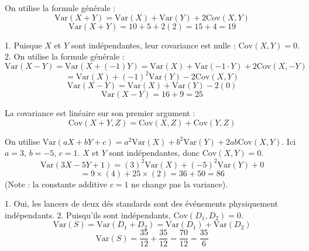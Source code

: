 
\begin{correctionbox}
On utilise la formule générale :
$$ \text{Var}(X+Y) = \text{Var}(X) + \text{Var}(Y) + 2\text{Cov}(X,Y) $$
$$ \text{Var}(X+Y) = 10 + 5 + 2(2) = 15 + 4 = 19 $$
\end{correctionbox}

\begin{correctionbox}
1.  Puisque $X$ et $Y$ sont indépendantes, leur covariance est nulle : $\text{Cov}(X,Y) = 0$.
2.  On utilise la formule générale :
    $$ \text{Var}(X-Y) = \text{Var}(X + (-1)Y) = \text{Var}(X) + \text{Var}(-1 \cdot Y) + 2\text{Cov}(X, -Y) $$
    $$ = \text{Var}(X) + (-1)^2 \text{Var}(Y) - 2\text{Cov}(X, Y) $$
    $$ \text{Var}(X-Y) = \text{Var}(X) + \text{Var}(Y) - 2(0) $$
    $$ \text{Var}(X-Y) = 16 + 9 = 25 $$
\end{correctionbox}

\begin{correctionbox}
La covariance est linéaire sur son premier argument :
$$ \text{Cov}(X+Y, Z) = \text{Cov}(X, Z) + \text{Cov}(Y, Z) $$
\end{correctionbox}

\begin{correctionbox}
On utilise $\text{Var}(aX + bY + c) = a^2 \text{Var}(X) + b^2 \text{Var}(Y) + 2ab\text{Cov}(X,Y)$.
Ici $a=3$, $b=-5$, $c=1$. $X$ et $Y$ sont indépendantes, donc $\text{Cov}(X,Y)=0$.
$$ \text{Var}(3X - 5Y + 1) = (3)^2 \text{Var}(X) + (-5)^2 \text{Var}(Y) + 0 $$
$$ = 9 \times (4) + 25 \times (2) = 36 + 50 = 86 $$
(Note : la constante additive $c=1$ ne change pas la variance).
\end{correctionbox}

\begin{correctionbox}
1.  Oui, les lancers de deux dés standards sont des événements physiquement indépendants.
2.  Puisqu'ils sont indépendants, $\text{Cov}(D_1, D_2) = 0$.
    $$ \text{Var}(S) = \text{Var}(D_1 + D_2) = \text{Var}(D_1) + \text{Var}(D_2) $$
    $$ \text{Var}(S) = \frac{35}{12} + \frac{35}{12} = \frac{70}{12} = \frac{35}{6} $$
\end{correctionbox}

